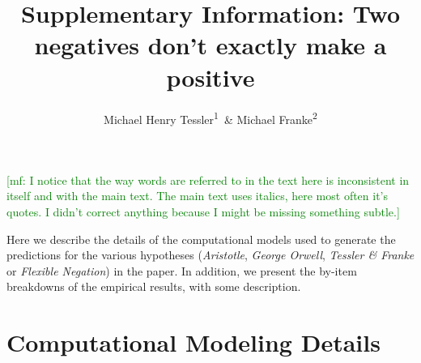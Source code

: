 \documentclass[floatsintext,doc]{apa6}
\title{Supplementary Information: Two negatives don't exactly make a positive}
\author{Michael Henry Tessler\textsuperscript{1}~\& Michael Franke\textsuperscript{2}}
\date{}
\affiliation{
\vspace{0.5cm}
\textsuperscript{1} Massachusetts Institute of Technology\\\textsuperscript{2} University of Osnabr\"{u}ck}
\providecommand{\tightlist}{%
  \setlength{\itemsep}{0pt}\setlength{\parskip}{0pt}}
\let\rmarkdownfootnote\footnote%
\def\footnote{\protect\rmarkdownfootnote}
\begin{document}
\maketitle

\newcommand*\diff{\mathop{}\!\mathrm{d}}
\newcommand{\denote}[1]{\mbox{ $[\![ #1 ]\!]$}}
\newcommand{\tableref}[1]{Table$\thinspace$\ref{#1}}
\newcommand{\figref}[1]{Fig.$\thinspace$\ref{#1}}
\newcommand{\appref}[1]{Appendix \ref{#1}}
\newcommand{\sectionref}[1]{Section \ref{#1}}

\newcommand{\red}[1]{\textcolor{Red}{#1}}  
\newcommand{\mf}[1]{\textcolor{Green}{[mf: #1]}}  
\newcommand{\mht}[1]{\textcolor{Blue}{[mht: #1]}}


\providecommand{\tightlist}{%
  \setlength{\itemsep}{0pt}\setlength{\parskip}{0pt}}

\newcommand{\ourmodel}{Flexible Negation\xspace}

\mf{I notice that the way words are referred to in the text here is inconsistent in itself and with the main text. The main text uses italics, here most often it's quotes. I didn't correct anything because I might be missing something subtle.}

Here we describe the details of the computational models used to generate the predictions for the various hypotheses (\emph{Aristotle}, \emph{George Orwell}, \emph{Tessler \& Franke} or \emph{\ourmodel}) in the paper.
In addition, we present the by-item breakdowns of the empirical results, with some description.


\section{Computational Modeling Details}

%


\end{document}
